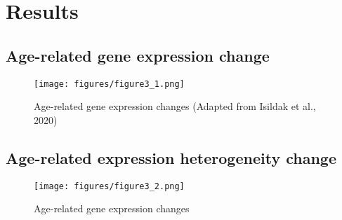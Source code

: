 \chapter{Results}
\label{chp:b3}


\section{Age-related gene expression change}

\begin{figure}[h]
\centering
\texttt{[image: figures/figure3\_1.png]}
\caption{Age-related gene expression changes (Adapted from Isildak et al., 2020)}
\label{fig:fig3.1}
\end{figure}


\section{Age-related expression heterogeneity change}



\begin{figure}[h]
\centering
\texttt{[image: figures/figure3\_2.png]}
\caption{Age-related gene expression changes}
\label{fig:fig3.2}
\end{figure}


